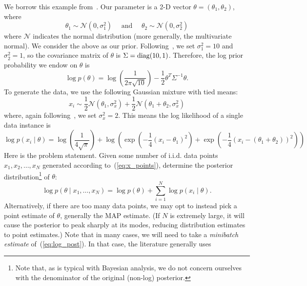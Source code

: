 \documentclass{article}
\begin{document}
We borrow this example from~\cite{langevin_2011}. Our parameter is a 2-D vector $\theta =
(\theta_1, \theta_2)$, where
\begin{equation}
\theta_1 \sim \mathcal{N}(0, \sigma_1^2) \quad \mbox{ and } \quad \theta_2 \sim \mathcal{N}(0, \sigma_2^2)
\end{equation}
where $\mathcal{N}$ indicates the normal distribution (more generally, the multivariate normal). We
consider the above as our prior. Following~\cite{langevin_2011}, we set $\sigma_1^2 = 10$ and
$\sigma_2^2=1$, so the covariance matrix of $\theta$ is $\Sigma = {\rm diag}(10,1)$. Therefore, the
log prior probability we endow on $\theta$ is
\begin{equation}
\log p(\theta) = \log \left(\frac{1}{2\pi\sqrt{10}}\right) - \frac{1}{2}\theta^T\Sigma^{-1}\theta.
\end{equation}
To generate the data, we use the following Gaussian mixture with tied means:
\begin{equation}\label{eq:x_points}
x_i \sim \frac{1}{2}\mathcal{N}(\theta_1, \sigma_x^2) + \frac{1}{2}\mathcal{N}(\theta_1+\theta_2, \sigma_x^2)
\end{equation}
where, again following~\cite{langevin_2011}, we set $\sigma_x^2 = 2$. This means the log likelihood
of a single data instance is
\begin{equation}
\log p(x_i \mid \theta) = \log\left(\frac{1}{4\sqrt{\pi}}\right) +
\log\left(\exp\left(-\frac{1}{4}(x_i - \theta_1)^2\right) + \exp\left(-\frac{1}{4}(x_i -
(\theta_1+\theta_2))^2\right)\right)
\end{equation}
Here is the problem statement. Given some number of i.i.d. data points $x_1, x_2, \ldots, x_N$
generated according to~(\ref{eq:x_points}), determine the posterior distribution\footnote{Note that,
as is typical with Bayesian analysis, we do not concern ourselves with the denominator of the
original (non-log) posterior.} of $\theta$:
\begin{equation}\label{eq:log_post}
\log p(\theta \mid x_1,\ldots,x_N) = \log p(\theta) + \sum_{i=1}^N\log p(x_i \mid \theta).
\end{equation}
Alternatively, if there are too many data points, we may opt to instead pick a point estimate of
$\theta$, generally the MAP estimate. (If $N$ is extremely large, it will cause the posterior to
peak sharply at its modes, reducing distribution estimates to point estimates.) Note that in many
cases, we will need to take a \emph{minibatch estimate} of~(\ref{eq:log_post}). In that case, the
literature generally uses
\end{document}
